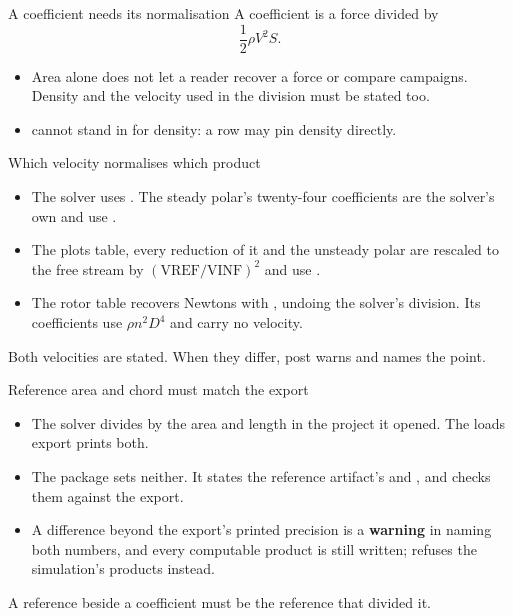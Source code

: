 \begin{frame}{A coefficient needs its normalisation}
\small A coefficient is a force divided by
\[
  \frac{1}{2}\rho V^2 S.
\]
\begin{itemize}
  \item Area alone does not let a reader recover a force or compare campaigns.
        Density and the velocity used in the division must be stated too.
  \item {} cannot stand in for density: a row may pin density directly.
\end{itemize}
\end{frame}

\begin{frame}{Which velocity normalises which product}
\begin{itemize}\small
  \item The solver uses . The steady polar's twenty-four
        coefficients are the solver's own and use .
  \item The plots table, every reduction of it and the unsteady polar are
        rescaled to the free stream by
        $\left(\mathrm{VREF}/\mathrm{VINF}\right)^2$ and use .
  \item The rotor table recovers Newtons with , undoing the
        solver's division. Its coefficients use $\rho n^2 D^4$ and carry
        no velocity.
\end{itemize}
\begin{takeaway}
Both velocities are stated. When they differ, post warns and names the point.
\end{takeaway}
\end{frame}

\begin{frame}{Reference area and chord must match the export}
\begin{itemize}\small
  \item The solver divides by the area and length in the project it opened.
        The loads export prints both.
  \item The package sets neither. It states the reference artifact's
         and , and checks them against the export.
  \item A difference beyond the export's printed precision is a
        \textbf{warning} in  naming both numbers, and every
        computable product is still written;
         refuses the simulation's products instead.
\end{itemize}
\begin{takeaway}
A reference beside a coefficient must be the reference that divided it.
\end{takeaway}
\end{frame}

